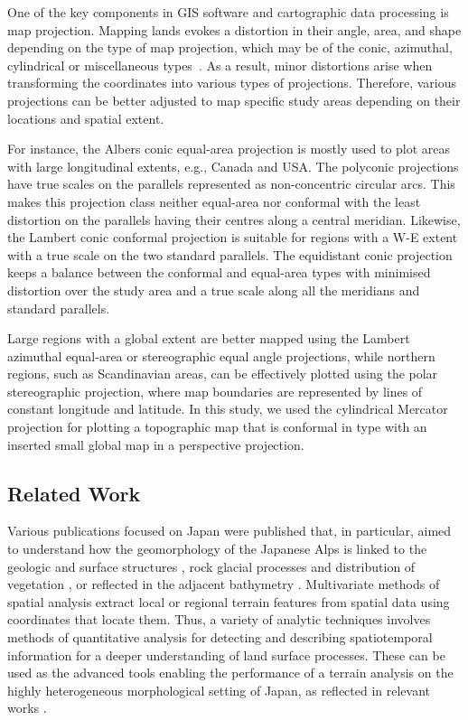 \documentclass[land,article,accept,pdftex,moreauthors]{Definitions/mdpi}
\begin{document}
One of the key components in GIS software and cartographic data processing is map projection. Mapping lands evokes a distortion in their angle, area, and shape depending on the type of map projection, which may be of the conic, azimuthal, cylindrical or miscellaneous types~\cite{Ghaderpour}. As a result, minor distortions arise when transforming the coordinates into various types of projections. {Therefore}, various projections can be better adjusted to map specific study {areas} depending on their locations and spatial extent. 

For instance, the Albers conic equal-area projection is mostly used to plot areas with large longitudinal extents, e.g., Canada and USA. The polyconic projections have true scales on the parallels represented as non-concentric circular arcs. This makes this projection class neither equal-area nor conformal with the least distortion on the parallels having their centres along a central meridian. Likewise, the Lambert conic conformal projection is suitable for regions with a W-E extent with a true scale on the two standard parallels. The equidistant conic projection keeps a balance between the conformal and equal-area types with minimised distortion over the study area and a true scale along all the meridians and standard parallels. 

Large regions with a global extent are better mapped using the Lambert azimuthal equal-area or stereographic equal angle projections, while northern regions, such as Scandinavian areas, can be effectively plotted using the polar stereographic projection, where map boundaries are represented by lines of constant longitude and latitude. In this study, we used the cylindrical Mercator projection for plotting a topographic map that is conformal in type with an inserted small global map in a perspective projection.

\subsection{Related Work}

Various publications focused on Japan were published that, in particular, aimed to understand how the geomorphology of the Japanese Alps is linked to the geologic and surface structures \cite{MATSUOKA201965}, rock glacial processes and distribution of vegetation \cite{FUJINO2023100146}, or reflected in the adjacent bathymetry \cite{Kariya2002}. Multivariate methods of spatial analysis extract local or regional terrain features from spatial data using coordinates that locate them. Thus, a variety of analytic techniques involves methods of quantitative analysis for detecting and describing spatiotemporal information for a deeper understanding of land surface processes. These can be used as the advanced tools enabling the performance of a terrain analysis on the highly heterogeneous morphological setting of Japan, as reflected in relevant works \cite{Oguchi2000,OGUCHI2020106805,MATSUURA2015133,NIWA2021107835,HATTANJI2021107943}. 
\end{document}
